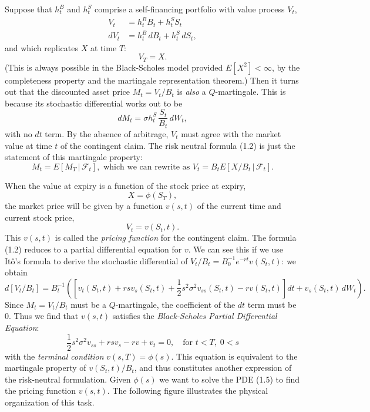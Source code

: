 Suppose that $h_{t}^{B}$ and $h_{t}^{S}$ comprise a self-financing portfolio with value process $V_{t}$,
\begin{align*}
V_{t}&=h_{t}^{B}B_{t}+h_{t}^{S}S_{t}\\
dV_{t}&=h_{t}^{B}\, dB_{t}+h_{t}^{S}\, dS_{t},
\end{align*}
and which replicates $X$ at time $T$:
\begin{equation*}
V_{T}=X.
\end{equation*}
(This is always possible in the Black-Scholes model provided $E[X^{2}]<\infty$, by the completeness property and the martingale representation theorem.) Then it turns out that the discounted asset price $M_{t}=V_{t}/B_{t}$ is \textit{also} a $Q$-martingale. This is because its stochastic differential works out to be
\begin{equation*}
dM_{t}=\sigma h_{t}^{S}\,\frac{S_{t}}{B_{t}}\, dW_{t},
\end{equation*}
with no $dt$ term. By the absence of arbitrage, $V_{t}$ must agree with the market value at time $t$ of the contingent claim. The risk neutral formula (1.2) is just the statement of this martingale property:
\begin{equation*}
M_{t}=E[M_{T}\,|\,\mathcal{F}_{t}],\text{ which we can rewrite as }V_{t}=B_{t}E[X/B_{t}\,|\,\mathcal{F}_{t}].
\end{equation*}

When the value at expiry is a function of the stock price at expiry,
\begin{equation*}
X=\phi(S_{T}),
\end{equation*}
the market price will be given by a function $v(s,t)$ of the current time and current stock price,
\begin{equation*}
V_{t}=v(S_{t},t).
\end{equation*}
This $v(s,t)$ is called the \textit{pricing function} for the contingent claim. The formula (1.2) reduces to a partial differential equation for $v$. We can see this if we use It\^o's formula to derive the stochastic differential of $V_{t}/B_{t}=B_{0}^{-1}e^{-rt}v(S_{t},t)$: we obtain
\begin{equation*}
d[V_{t}/B_{t}]=B_{t}^{-1}\left(\left[v_{t}(S_{t},t)+rsv_{s}(S_{t},t)+\frac{1}{2}s^{2}\sigma^{2}v_{ss}(S_{t},t)-rv(S_{t},t)\right]dt+v_{s}(S_{t},t)\, dW_{t}\right).
\end{equation*}
Since $M_{t}=V_{t}/B_{t}$ must be a $Q$-martingale, the coefficient of the $dt$ term must be $0$. Thus we find that $v(s,t)$ satisfies the \textit{Black-Scholes Partial Differential Equation}:
\[
\frac{1}{2}s^{2}\sigma^{2}v_{ss}+rsv_{s}-rv+v_{t}=0,\quad \text{for }t<T,\;0<s \tag{1.5}
\]
with the \textit{terminal condition} $v(s,T)=\phi(s)$. This equation is equivalent to the martingale property of $v(S_{t},t)/B_{t}$, and thus constitutes another expression of the risk-neutral formulation. Given $\phi(s)$ we want to solve the PDE (1.5) to find the pricing function $v(s,t)$. The following figure illustrates the physical organization of this task.

